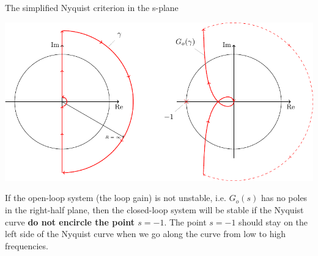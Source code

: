 \documentclass[presentation,aspectratio=169]{beamer}
\begin{document}
\begin{frame}[label={sec:org882c548}]{The simplified Nyquist criterion in the s-plane}
\begin{center}
\includegraphics[width=0.65\linewidth]{../../figures/implane-nyquist-contour-map}
\end{center}

\pause

\begin{tcolorbox}
If the open-loop system (the loop gain) is not unstable, i.e. $G_o(s)$ has no poles in the right-half plane, then the closed-loop system will be stable if the Nyquist curve \textbf{do not encircle the point \(s=-1\)}. The point $s=-1$ should stay on the left side of the Nyquist curve when we go along the curve from low to high frequencies.
\end{tcolorbox}
\end{frame}
\end{document}
